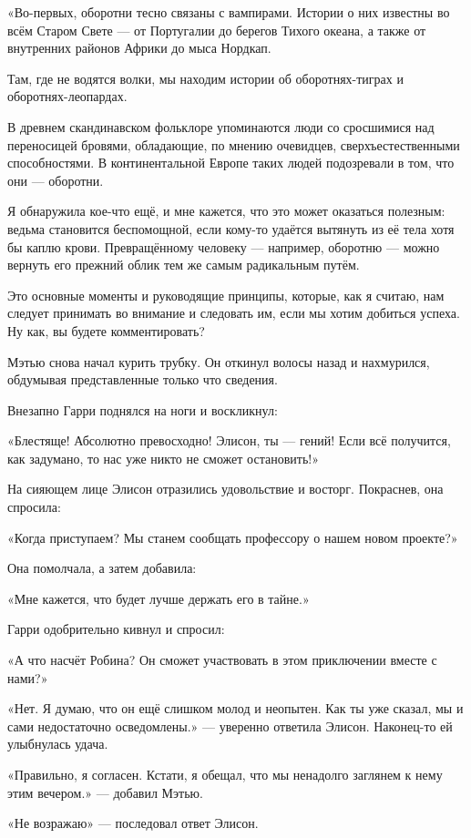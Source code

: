\documentclass[a5paper, 9pt,
final, openany, twoside=true]{memoir}
\begin{document}
«Во-первых, оборотни тесно связаны с вампирами. Истории о них известны во всём Старом Свете — от Португалии до берегов Тихого океана, а также от внутренних районов Африки до мыса Нордкап.

Там, где не водятся волки, мы находим истории об оборотнях-тиграх и оборотнях-леопардах.

В древнем скандинавском фольклоре упоминаются люди со сросшимися над переносицей бровями, обладающие, по мнению очевидцев, сверхъестественными способностями. В континентальной Европе таких людей подозревали в том, что они — оборотни.

Я обнаружила кое-что ещё,  и мне кажется, что это может оказаться полезным: ведьма становится беспомощной, если кому-то удаётся вытянуть из её тела хотя бы каплю крови. Превращённому человеку — например, оборотню — можно вернуть его прежний облик тем же самым радикальным путём.

Это основные моменты и руководящие принципы, которые, как я считаю, нам следует принимать во внимание и следовать им, если мы хотим добиться успеха. Ну как, вы будете комментировать?\bigskip

Мэтью снова начал курить трубку. Он откинул волосы назад и нахмурился, обдумывая представленные только что сведения.\bigskip

Внезапно Гарри поднялся на ноги и воскликнул:

«Блестяще! Абсолютно превосходно! Элисон, ты — гений! Если всё получится, как задумано, то нас уже никто не сможет остановить!»

На сияющем лице Элисон отразились удовольствие и восторг. Покраснев, она спросила:

«Когда приступаем? Мы станем сообщать профессору о нашем новом проекте?»

Она помолчала, а затем добавила:

«Мне кажется, что будет лучше держать его в тайне.»

Гарри одобрительно кивнул и спросил:

«А что насчёт Робина? Он сможет участвовать в этом приключении вместе с нами?»

«Нет. Я думаю, что он ещё слишком молод и неопытен. Как ты уже сказал, мы и сами недостаточно осведомлены.» — уверенно ответила Элисон. Наконец-то ей улыбнулась удача.

«Правильно, я согласен. Кстати, я обещал, что мы ненадолго заглянем к нему этим вечером.» — добавил Мэтью.

«Не возражаю» — последовал ответ Элисон.\bigskip
\end{document}
